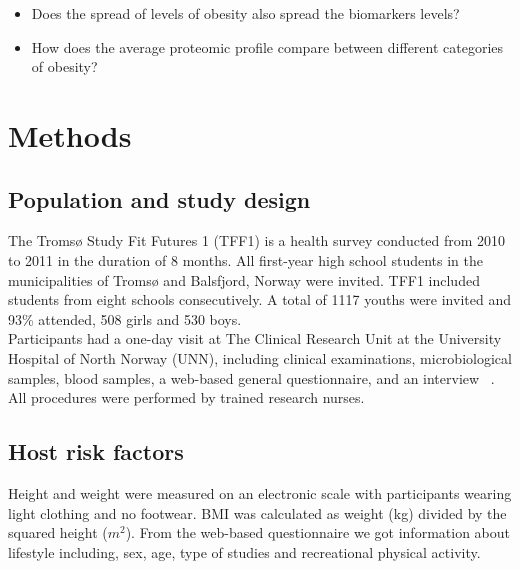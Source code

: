 \documentclass[10pt, a4paper, onecolumn]{article} %
\begin{document}
\begin{itemize}

  \item Does the spread of levels of obesity also spread the biomarkers levels?\\
  
  \item How does the average proteomic profile compare between different categories of obesity?
  
\end{itemize}


 

\section{Methods}

\subsection{Population and study design}

The Tromsø Study Fit Futures 1 (TFF1) is a health survey conducted from 2010 to 2011 in the duration of 8 months. All first-year high school students in the municipalities of Tromsø and Balsfjord, Norway were invited. TFF1 included students from eight schools consecutively. A total of 1117 youths were invited and 93\% attended, 508 girls and 530 boys.\\
 
Participants had a one-day visit at The Clinical Research Unit at the University Hospital of North Norway (UNN), including clinical examinations, microbiological samples, blood samples, a web-based general questionnaire, and an interview ~\cite{ref:FitFutures}. All procedures were performed by trained research nurses.\\

\subsection{Host risk factors}

Height and weight were measured on an electronic scale with participants wearing light clothing and no footwear. BMI was calculated as weight (kg) divided by the squared height ($m^{2}$). From the web-based questionnaire we got information about lifestyle including, sex, age, type of studies and recreational physical activity. \\
\end{document}

